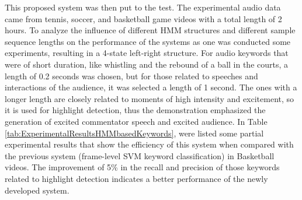     This proposed system was then put to the test. The experimental audio data came from tennis, soccer, and basketball game videos with a total length of 2 hours. To analyze the influence of different \gls{HMM} structures and different sample sequence lengths on the performance of the systems as one was conducted some experiments, resulting in a 4-state left-right structure. For audio keywords that were of short duration, like whistling and the rebound of a ball in the courts, a length of 0.2 seconds was chosen, but for those related to speeches and interactions of the audience, it was selected a length of 1 second. The ones with a longer length are closely related to moments of high intensity and excitement, so it is used for highlight detection, thus the demonstration emphasized the generation of excited commentator speech and excited audience. In Table \ref{tab:ExperimentalResultsHMMbasedKeywords}, were listed some partial experimental results that show the efficiency of this system when compared with the previous system (frame-level \gls{SVM} keyword classification) in Basketball videos. The improvement of 5\% in the recall and precision of those keywords related to highlight detection indicates a better performance of the newly developed system.

